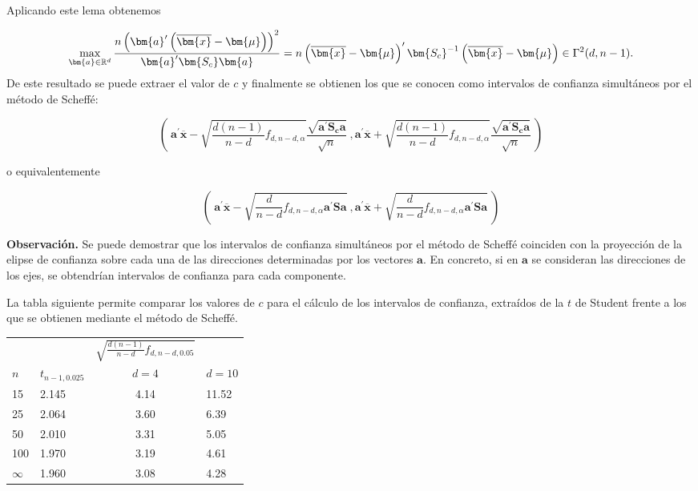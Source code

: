 \documentclass[
  a4paper,
  oneside]{scrbook}
\newcounter{none} %
\theoremstyle{definition}
\theoremstyle{definition}
\theoremstyle{definition}
\theoremstyle{definition}
\theoremstyle{remark}
\begin{document}
Aplicando este lema obtenemos

\[\max_{\bm{a}\in{\Bbb R}^d}\frac{n\left(\bm{a}^\prime{}\left(\overline{\bm{x}}-\bm{\mu}\right)\right)^2}{\bm{a}^\prime{}\bm{S_c}\bm{a}}
=n\left(\overline{\bm{x}}-\bm{\mu}\right)^\prime{}\bm {S_c}^{-1}\left(\overline{\bm{x}}-\bm{\mu}\right)\in \Gamma^2(d,n-1).\]
De este resultado se puede extraer el valor de \(c\) y finalmente se
obtienen los que se conocen como intervalos de confianza simultáneos por
el método de Scheffé:

\[\left(\ \bm{a}^\prime{}\overline{\bm{x}} - \sqrt{\frac{d(n-1)}{n-d}f_{d,n-d,\alpha}}\frac{\sqrt{\bm{a}^\prime{}\bm{S_c}\bm{a}}}{\sqrt{n}}\ ,
 \bm{a}^\prime{}\overline{\bm{x}} + \sqrt{\frac{d(n-1)}{n-d}f_{d,n-d,\alpha}}\frac{\sqrt{\bm{a}^\prime{}\bm {S_c}\bm{a}}}{\sqrt{n}}\ \right)\]

o equivalentemente

\[\left(\ \bm{a}^\prime{}\overline{\bm{x}} - \sqrt{\frac{d}{n-d}f_{d,n-d,\alpha}\bm{a}^\prime{}\bm{S}\bm{a}}\ ,
 \bm{a}^\prime{}\overline{\bm{x}} + \sqrt{\frac{d}{n-d}f_{d,n-d,\alpha}\bm{a}^\prime{}\bm{S}\bm{a}}\ \right)\]

\textbf{Observación.} Se puede demostrar que los intervalos de confianza
simultáneos por el método de Scheffé coinciden con la proyección de la
elipse de confianza sobre cada una de las direcciones determinadas por
los vectores \(\bm{a}\). En concreto, si en \(\bm{a}\) se consideran las
direcciones de los ejes, se obtendrían intervalos de confianza para cada
componente.

La tabla siguiente permite comparar los valores de \(c\) para el cálculo
de los intervalos de confianza, extraídos de la \(t\) de Student frente a
los que se obtienen mediante el método de Scheffé.

{\def\LTcaptype{none} %
\begin{longtable}[]{@{}llcl@{}}
\toprule\noalign{}
\endhead
\bottomrule\noalign{}
\endlastfoot
& & \(\sqrt{\frac{d(n-1)}{n-d}f_{d,n-d,0.05}}\) & \\
\(n\) & \(t_{n-1,0.025}\) & \(d=4\) & \(d=10\) \\
15 & 2.145 & 4.14 & 11.52 \\
25 & 2.064 & 3.60 & 6.39 \\
50 & 2.010 & 3.31 & 5.05 \\
100 & 1.970 & 3.19 & 4.61 \\
\(\infty\) & 1.960 & 3.08 & 4.28 \\
\end{longtable}
}
\end{document}
